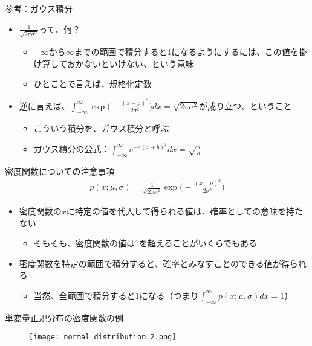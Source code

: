 \documentclass[aspectratio=169,unicode,dvipdfmx,14pt]{beamer}
\begin{document}
\begin{frame}{参考：ガウス積分}
\begin{itemize}
\item $\frac{1}{\sqrt{2\pi\sigma^2}}$って、何？
\begin{itemize}
\item $-\infty$から$\infty$までの範囲で積分すると1になるようにするには、この値を掛け算しておかないといけない、という意味
\item ひとことで言えば、規格化定数
\end{itemize}
\item 逆に言えば、$\int_{-\infty}^\infty \exp\Big( - \frac{(x - \mu)^2}{2\sigma^2} \Big) dx = \sqrt{2\pi\sigma^2}$が成り立つ、ということ
\begin{itemize}
\item こういう積分を、ガウス積分と呼ぶ
\item ガウス積分の公式：$\int_{-\infty}^\infty e^{-a(x+b)^2}dx = \sqrt{\frac{\pi}{a}}$
\end{itemize}
\end{itemize}
\end{frame}


\begin{frame}{密度関数についての注意事項}
\begin{align}
p(x;\mu,\sigma) = \frac{1}{\sqrt{2\pi\sigma^2}}\exp\Big( - \frac{(x - \mu)^2}{2\sigma^2} \Big)
\end{align}
\begin{itemize}
\item 密度関数の$x$に特定の値を代入して得られる値は、確率としての意味を持たない
\begin{itemize}
\item そもそも、密度関数の値は1を超えることがいくらでもある
\end{itemize}
\item 密度関数を特定の範囲で積分すると、確率とみなすことのできる値が得られる
\begin{itemize}
\item 当然、全範囲で積分すると1になる（つまり$\int_{-\infty}^\infty p(x;\mu,\sigma)dx = 1$）
\end{itemize}
\end{itemize}
\end{frame}

\begin{frame}{単変量正規分布の密度関数の例}
\begin{figure}[b]
\begin{center}
\texttt{[image: normal\_distribution\_2.png]}
\end{center}
\end{figure}
\end{frame}
\end{document}
